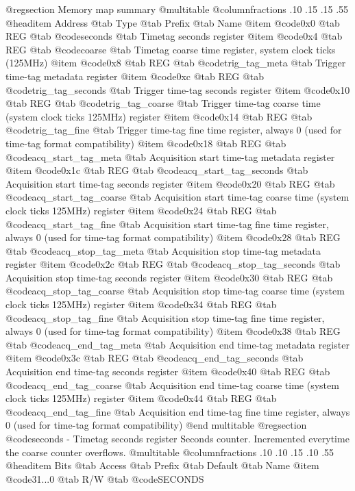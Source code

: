 @regsection Memory map summary
@multitable  @columnfractions .10 .15 .15 .55
@headitem Address @tab Type @tab Prefix @tab Name
@item @code{0x0} @tab
REG @tab
@code{seconds} @tab
Timetag seconds register
@item @code{0x4} @tab
REG @tab
@code{coarse} @tab
Timetag coarse time register, system clock ticks (125MHz)
@item @code{0x8} @tab
REG @tab
@code{trig_tag_meta} @tab
Trigger time-tag metadata register
@item @code{0xc} @tab
REG @tab
@code{trig_tag_seconds} @tab
Trigger time-tag seconds register
@item @code{0x10} @tab
REG @tab
@code{trig_tag_coarse} @tab
Trigger time-tag coarse time (system clock ticks 125MHz) register
@item @code{0x14} @tab
REG @tab
@code{trig_tag_fine} @tab
Trigger time-tag fine time register, always 0 (used for time-tag format compatibility)
@item @code{0x18} @tab
REG @tab
@code{acq_start_tag_meta} @tab
Acquisition start time-tag metadata register
@item @code{0x1c} @tab
REG @tab
@code{acq_start_tag_seconds} @tab
Acquisition start time-tag seconds register
@item @code{0x20} @tab
REG @tab
@code{acq_start_tag_coarse} @tab
Acquisition start time-tag coarse time (system clock ticks 125MHz) register
@item @code{0x24} @tab
REG @tab
@code{acq_start_tag_fine} @tab
Acquisition start time-tag fine time register, always 0 (used for time-tag format compatibility)
@item @code{0x28} @tab
REG @tab
@code{acq_stop_tag_meta} @tab
Acquisition stop time-tag metadata register
@item @code{0x2c} @tab
REG @tab
@code{acq_stop_tag_seconds} @tab
Acquisition stop time-tag seconds register
@item @code{0x30} @tab
REG @tab
@code{acq_stop_tag_coarse} @tab
Acquisition stop time-tag coarse time (system clock ticks 125MHz) register
@item @code{0x34} @tab
REG @tab
@code{acq_stop_tag_fine} @tab
Acquisition stop time-tag fine time register, always 0 (used for time-tag format compatibility)
@item @code{0x38} @tab
REG @tab
@code{acq_end_tag_meta} @tab
Acquisition end time-tag metadata register
@item @code{0x3c} @tab
REG @tab
@code{acq_end_tag_seconds} @tab
Acquisition end time-tag seconds register
@item @code{0x40} @tab
REG @tab
@code{acq_end_tag_coarse} @tab
Acquisition end time-tag coarse time (system clock ticks 125MHz) register
@item @code{0x44} @tab
REG @tab
@code{acq_end_tag_fine} @tab
Acquisition end time-tag fine time register, always 0 (used for time-tag format compatibility)
@end multitable 
@regsection @code{seconds} - Timetag seconds register
Seconds counter. Incremented everytime the coarse counter overflows.
@multitable @columnfractions .10 .10 .15 .10 .55
@headitem Bits @tab Access @tab Prefix @tab Default @tab Name
@item @code{31...0}
@tab R/W @tab
@code{SECONDS}
